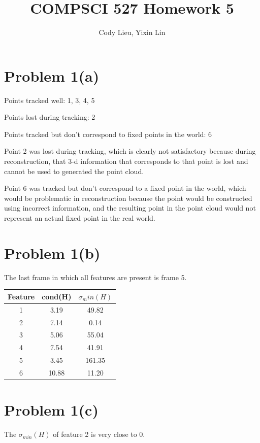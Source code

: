 \documentclass{article}
\author{Cody Lieu, Yixin Lin}
\title{COMPSCI 527 Homework 5}
\begin{document}
\maketitle

\section*{Problem 1(a)}

Points tracked well: 1, 3, 4, 5

Points lost during tracking: 2

Points tracked but don't correspond to fixed points in the world: 6

Point 2 was lost during tracking, which is clearly not satisfactory because during reconstruction, that 3-d information that corresponds to that point is lost and cannot be used to generated the point cloud.

Point 6 was tracked but don't correspond to a fixed point in the world, which would be problematic in reconstruction because the point would be constructed using incorrect information, and the resulting point in the point cloud would not represent an actual fixed point in the real world.

\section*{Problem 1(b)}

The last frame in which all features are present is frame 5.

\begin{center}
\begin{tabular}{ ||c|c|c|| } 
	\hline
	Feature & cond(H) & $\sigma_min(H)$ \\ \hline
 	1 &3.19 &49.82 \\ 
	2 &7.14 &0.14 \\
	3 &5.06 &55.04 \\
	4 &7.54 &41.91 \\
	5 &3.45 &161.35 \\
	6 &10.88 &11.20 \\
\hline
\end{tabular}
\end{center}

\section*{Problem 1(c)}
The $\sigma_{min}(H)$ of feature 2 is very close to 0.
\end{document}
